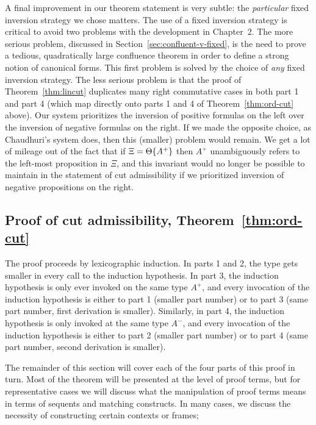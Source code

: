 A final improvement in our theorem statement is very subtle: the {\it
  particular} fixed inversion strategy we chose matters.  The use of a
fixed inversion strategy is critical to avoid two problems with the
development in Chapter~2. The more serious problem, discussed in
Section~\ref{sec:confluent-v-fixed}, is the need to prove a tedious,
quadratically large confluence theorem in order to define a strong
notion of canonical forms. This first problem is solved by the choice
of {\it any} fixed inversion strategy. The less serious problem is
that the proof of Theorem~\ref{thm:lincut} duplicates many right
commutative cases in both part 1 and part 4 (which map directly onto
parts 1 and 4 of Theorem~\ref{thm:ord-cut} above). Our system
prioritizes the inversion of positive formulas on the left over the
inversion of negative formulas on the right. If we made the opposite
choice, as Chaudhuri's system does, then this (smaller) problem 
would remain. We get a lot of mileage out of the
fact that if $\Xi = {\Theta}\{{A^+}\}$ then $A^+$ unambiguously
refers to the left-most proposition in $\Xi$, and this invariant would
no longer be possible to maintain in the statement of cut
admissibility if we prioritized inversion of negative propositions on
the right.


\subsection{Proof of cut admissibility, Theorem~\ref{thm:ord-cut}}

The proof proceeds by lexicographic induction.  In parts 1 and 2, the
type gets smaller in every call to the induction hypothesis. In part
3, the induction hypothesis is only ever invoked on the same type
$A^+$, and every invocation of the induction hypothesis is either to
part 1 (smaller part number) or to part 3 (same part number, first
derivation is smaller). Similarly, in part 4, the induction hypothesis
is only invoked at the same type $A^-$, and every invocation of the
induction hypothesis is either to part 2 (smaller part number) or to
part 4 (same part number, second derivation is smaller).

The remainder of this section will cover each of the four parts of
this proof in turn. Most of the theorem will be presented at the level
of proof terms, but for representative cases we will discuss what the
manipulation of proof terms means in terms of sequents and matching
constructs. In many cases, we discuss the necessity of constructing
certain contexts or frames; 

